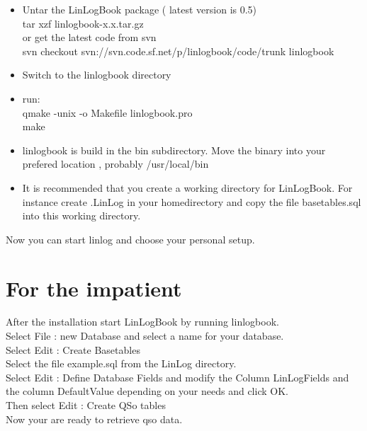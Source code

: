 \documentclass[a4paper,11pt]{article}
\begin{document}
\begin{itemize}
\item Untar the LinLogBook package ( latest version is 0.5)\\
tar xzf linlogbook-x.x.tar.gz\\
or get the latest code from svn\\
svn checkout svn://svn.code.sf.net/p/linlogbook/code/trunk linlogbook
\item Switch to the linlogbook directory
\item run:\\
qmake -unix -o Makefile linlogbook.pro\\
make
\item linlogbook is build in the bin subdirectory. Move the binary into your prefered
location , probably /usr/local/bin
\item It is recommended that you create a working directory for LinLogBook.
For instance create .LinLog in your homedirectory and copy the file basetables.sql
into this working directory.
\end{itemize}
Now you can start linlog and choose your personal setup.

\section{For the impatient}
After the installation start LinLogBook by running linlogbook.\\
Select File : new Database and select a name for your database.\\
Select Edit : Create Basetables\\
Select the file example.sql from the LinLog directory.\\
Select Edit : Define Database Fields and modify the Column LinLogFields and the column DefaultValue depending on your needs and click OK.\\
Then select Edit : Create QSo tables\\
Now your are ready to retrieve qso data.
\end{document}
